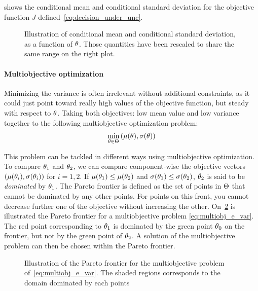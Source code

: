 \documentclass[../../Main_ManuscritThese.tex]{subfiles}
\newcommand\imgpath{/home/victor/acadwriting/Manuscrit/Text/Chapter3/img/}
\begin{document}
 shows the conditional mean and conditional standard deviation for the objective function $J$ defined~\cref{eq:decision_under_unc}.
\begin{figure}[ht]
  \centering
  
  \caption[Conditional mean and standard deviation]{Illustration of conditional mean and conditional standard deviation, as a function of $\theta$. Those quantities have been rescaled to share the same range on the right plot.}
  \label{fig:mean_std} 
\end{figure}

\paragraph{Multiobjective optimization}
\label{sec:multiobjective_optimization}
Minimizing the variance is often irrelevant without additional constraints, as it could just point toward really high values of the objective function, but steady with respect to $\theta$. Taking both objectives: low mean value and low variance together to the following multiobjective optimization problem:
\begin{align}
  \label{eq:multiobj_e_var}
  \min_{\theta\in\Theta} \left(\mu(\theta),\sigma(\theta)\right)
\end{align}


This problem can be tackled in different ways using multiobjective optimization.
To compare $\theta_1$ and $\theta_2$, we can compare component-wise the objective vectors $(\mu(\theta_i),\sigma(\theta_i))$ for $i=1,2$. If $\mu(\theta_1) \leq \mu(\theta_2)$ and $\sigma(\theta_1) \leq \sigma(\theta_2)$, $\theta_2$ is said to be \emph{dominated} by $\theta_1$. The Pareto frontier is defined as the set of points in $\Theta$ that cannot be dominated by any other points. For points on this front, you cannot decrease further one of the objective without increasing the other.
On~\cref{fig:pareto} is illustrated the Pareto frontier for a multiobjective problem \cref{eq:multiobj_e_var}. The red point corresponding to $\theta_1$ is dominated by the green point $\theta_0$ on the frontier, but not by the green point of $\theta_2$. A solution of the multiobjective problem can then be chosen within the Pareto frontier. 

\begin{figure}[ht]
  \centering
  
  \caption[Pareto frontier]{\label{fig:pareto} 
 Illustration of the Pareto frontier for the multiobjective problem of~\cref{eq:multiobj_e_var}. The shaded regions corresponds to the domain dominated by each points}
\end{figure}
\end{document}
